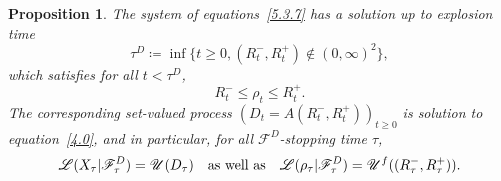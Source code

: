 \documentclass[10pt]{amsart}
\theoremstyle{plain}
\newtheorem{prop}[thm]{Proposition}
\theoremstyle{definition}
\newcommand{\SF}{{\mathscr F}}
\newcommand{\SL}{{\mathscr L}}
\newcommand{\SU}{{\mathscr U}}
\newcommand\df{\coloneqq}
\begin{document}
\begin{prop}
\label{P5.3.1}
The system of equations~\eqref{5.3.7} has a solution up to explosion time
\begin{equation}
\tau^D\df \inf\{t\ge 0, (R_t^-,R_t^+)\not\in (0,\infty)^2\},
\end{equation}
which satisfies for all $t<\tau^D$,
\begin{equation}
R_t^-\le\rho_t\le R_t^+.
\end{equation}
The corresponding set-valued process $(D_t=A(R_t^-,R_t^+))_{t\ge0}$ is solution to equation~\eqref{4.0}, and in particular, for all $\SF^D$-stopping time $\tau$,
\begin{equation}
\SL(X_\tau|\SF_\tau^D)=\SU(D_\tau)\quad\hbox{as well as}\quad \SL(\rho_\tau|\SF_\tau^D)=\SU^f((R_\tau^-,R_\tau^+)).
\end{equation}
\end{prop}
\end{document}
